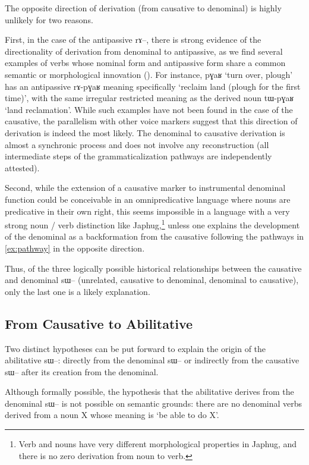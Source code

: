 \documentclass[oldfontcommands,oneside,a4paper,11pt]{article}
\newcommand{\ipa}[1]{{\phon \mbox{#1}}} %
\begin{document}
The opposite direction of derivation (from causative to denominal)  is highly unlikely for two reasons. 

First, in the case of the antipassive \ipa{rɤ--}, there is strong evidence of the directionality of derivation from denominal to antipassive, as we find several examples of verbs whose nominal form and antipassive form share a common semantic or morphological innovation  (\citealt{jacques14antipassive}). For instance, \ipa{pɣaʁ} `turn over, plough' has an antipassive \ipa{rɤ-pɣaʁ} meaning specifically `reclaim land (plough for the first time)', with the same irregular restricted meaning as the derived noun \ipa{tɯ-pɣaʁ} `land reclamation'. While such examples have not been found in the case of the causative, the parallelism with other voice markers suggest that this direction of derivation is indeed the most likely. The denominal to causative derivation is almost a synchronic process and does not involve any reconstruction (all intermediate steps of the grammaticalization pathways are independently attested). 

Second, while the   extension of a  causative marker to  instrumental denominal function could be conceivable in an omnipredicative language where nouns  are predicative in their own right, this seems impossible in a language with a very strong noun / verb distinction like Japhug,\footnote{Verb and nouns have very different morphological properties in Japhug, and there is no zero derivation from noun to verb.} unless one explains the development of the denominal as  a backformation from the causative following the pathways in \ref{ex:pathway} in the opposite direction.

Thus, of the three logically possible historical relationships between the causative and denominal \ipa{sɯ--} (unrelated, causative to denominal, denominal to causative), only the last one is a likely explanation.


\subsection{From Causative to Abilitative}

Two distinct hypotheses can be put forward to explain the origin of the abilitative \ipa{sɯ--}: directly from the denominal \ipa{sɯ--} or indirectly from the causative \ipa{sɯ--} after its creation from the denominal. 

Although formally possible, the hypothesis that the abilitative derives from the denominal \ipa{sɯ--} is not possible on semantic grounds: there are no denominal verbs derived from a noun X whose meaning is `be able to do X'.
\end{document}
